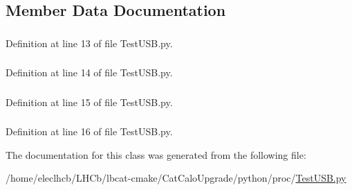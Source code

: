 \subsection{Member Data Documentation}
\hypertarget{classTestUSB_1_1TestUSB_a91f2d0bdbd9a0a59936c41d9f894882a}{
\subsubsection[{s1}]{}}
\label{classTestUSB_1_1TestUSB_a91f2d0bdbd9a0a59936c41d9f894882a}


Definition at line 13 of file TestUSB.py.\hypertarget{classTestUSB_1_1TestUSB_a3180c62896ef7f8c8115a8736fba2dc9}{
\subsubsection[{s2}]{}}
\label{classTestUSB_1_1TestUSB_a3180c62896ef7f8c8115a8736fba2dc9}


Definition at line 14 of file TestUSB.py.\hypertarget{classTestUSB_1_1TestUSB_ae82803b0f4d3e1a45bb5e80dba5a12d9}{
\subsubsection[{s3}]{}}
\label{classTestUSB_1_1TestUSB_ae82803b0f4d3e1a45bb5e80dba5a12d9}


Definition at line 15 of file TestUSB.py.\hypertarget{classTestUSB_1_1TestUSB_acf77fb78e3a4ad7443f8b3a5a035d7dc}{
\subsubsection[{s4}]{}}
\label{classTestUSB_1_1TestUSB_acf77fb78e3a4ad7443f8b3a5a035d7dc}


Definition at line 16 of file TestUSB.py.

The documentation for this class was generated from the following file:\begin{DoxyCompactItemize}
\item 
/home/eleclhcb/LHCb/lbcat-\/cmake/CatCaloUpgrade/python/proc/\hyperlink{TestUSB_8py}{TestUSB.py}\end{DoxyCompactItemize}
